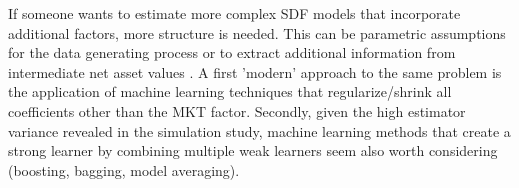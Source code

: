 \documentclass[12pt]{article}
\begin{document}
If someone wants to estimate more complex SDF models that incorporate additional factors, more structure is needed.
This can be parametric assumptions for the data generating process \citep{ACGP18} or to extract additional information from intermediate net asset values \citep{GSW19,BGG20}.
A first 'modern' approach to the same problem is the application of machine learning techniques that regularize/shrink all coefficients other than the MKT factor.
Secondly, given the high estimator variance revealed in the simulation study, machine learning methods that create a strong learner by combining multiple weak learners seem also worth considering (boosting, bagging, model averaging).









\newpage
\end{document}
